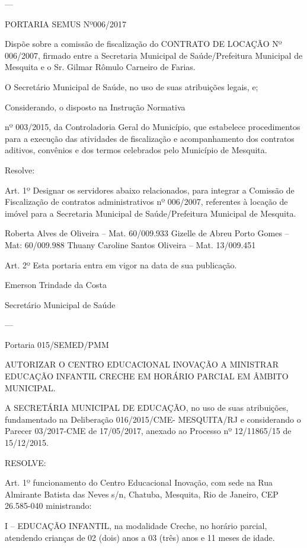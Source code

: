 \documentclass{doliberto}
\begin{document}
---

PORTARIA SEMUS Nº006/2017 
 

Dispõe sobre a comissão de fiscalização do 
CONTRATO DE LOCAÇÃO Nº 006/2007, firmado entre a 
Secretaria Municipal de Saúde/Prefeitura Municipal de 
Mesquita e o Sr. Gilmar Rômulo Carneiro de Farias. 
 

O  Secretário  Municipal  de  Saúde,  no  uso  de  suas 
atribuições legais, e; 
 
 
Considerando, o disposto na Instrução Normativa 
        
nº  003/2015,  da  Controladoria  Geral  do  Município,  que 
estabelece procedimentos para a execução das atividades de 
fiscalização  e  acompanhamento  dos  contratos  aditivos, 
convênios  e  dos  termos  celebrados  pelo  Município  de 
Mesquita.  
 
 
Resolve:  
 
Art.  1º  Designar  os  servidores  abaixo  relacionados,  para 
integrar  a  Comissão  de  Fiscalização  de  contratos 
administrativos nº 006/2007, referentes à locação de imóvel 
para a Secretaria Municipal de Saúde/Prefeitura Municipal 
de Mesquita. 
 
Roberta Alves de Oliveira – Mat. 60/009.933 
Gizelle de Abreu Porto Gomes – Mat: 60/009.988 
Thuany Caroline Santos Oliveira – Mat. 13/009.451 
 
Art.  2º  Esta  portaria  entra  em  vigor  na  data  de  sua 
publicação. 
 
 

Emerson Trindade da Costa 

Secretário Municipal de Saúde 

---

Portaria 015/SEMED/PMM 
 
AUTORIZAR  O  CENTRO  EDUCACIONAL  INOVAÇÃO  A 
MINISTRAR  EDUCAÇÃO  INFANTIL  CRECHE  EM  HORÁRIO 
PARCIAL EM ÂMBITO MUNICIPAL. 
 
A SECRETÁRIA MUNICIPAL DE EDUCAÇÃO, no uso de suas 
atribuições, fundamentado na Deliberação 016/2015/CME-
MESQUITA/RJ  e  considerando  o  Parecer  03/2017-CME  de 
17/05/2017,  anexado  ao  Processo  nº  12/11865/15  de 
15/12/2015. 
 
RESOLVE: 
 
Art.  1º 
funcionamento  do  Centro 
Educacional  Inovação,  com  sede  na  Rua  Almirante  Batista 
das  Neves  s/n,  Chatuba,  Mesquita,  Rio  de  Janeiro,  CEP 
26.585-040 ministrando: 
 
I – EDUCAÇÃO INFANTIL, na modalidade Creche, no horário 
parcial,  atendendo  crianças  de  02  (dois)  anos  a  03  (três) 
anos e 11 meses de idade.   
\end{document}
